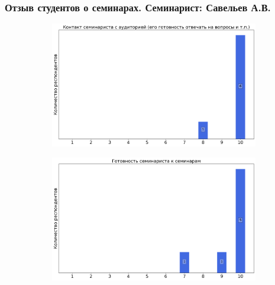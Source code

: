     \subsubsection{Отзыв студентов о семинарах. Семинарист: Савельев А.В.}
        \begin{figure}[H]
            \centering
            \begin{subfigure}[b]{0.45\textwidth}
                \centering
                \includegraphics[width=\textwidth]{images/1 course/Дискретный анализ/seminarists-marks-Савельев А.В.-0.png}
            \end{subfigure}
            \begin{subfigure}[b]{0.45\textwidth}
                \centering
                \includegraphics[width=\textwidth]{images/1 course/Дискретный анализ/seminarists-marks-Савельев А.В.-1.png}
            \end{subfigure}
            \begin{subfigure}[b]{0.45\textwidth}
                \centering

\end{subfigure}
\end{figure}
